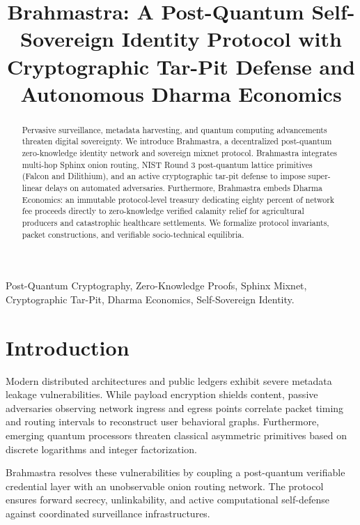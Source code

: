 \documentclass[conference,leqno]{IEEEtran}
\title{Brahmastra: A Post-Quantum Self-Sovereign Identity Protocol with Cryptographic Tar-Pit Defense and Autonomous Dharma Economics}
\author{\IEEEauthorblockN{Atmakuri Naresh}
\IEEEauthorblockA{\textit{Lead Architect \& Benevolent Dictator for Life (BDFL)} \\
\textit{Brahmastra Sovereign Core Foundation}\\
Zug, Switzerland / Puttaparthi, India \\
core@brahmastra.network}
}
\begin{document}
\maketitle

\begin{abstract}
Pervasive surveillance, metadata harvesting, and quantum computing advancements threaten digital sovereignty. We introduce Brahmastra, a decentralized post-quantum zero-knowledge identity network and sovereign mixnet protocol. Brahmastra integrates multi-hop Sphinx onion routing, NIST Round 3 post-quantum lattice primitives (Falcon and Dilithium), and an active cryptographic tar-pit defense to impose super-linear delays on automated adversaries. Furthermore, Brahmastra embeds Dharma Economics: an immutable protocol-level treasury dedicating eighty percent of network fee proceeds directly to zero-knowledge verified calamity relief for agricultural producers and catastrophic healthcare settlements. We formalize protocol invariants, packet constructions, and verifiable socio-technical equilibria.
\end{abstract}

\begin{IEEEkeywords}
Post-Quantum Cryptography, Zero-Knowledge Proofs, Sphinx Mixnet, Cryptographic Tar-Pit, Dharma Economics, Self-Sovereign Identity.
\end{IEEEkeywords}

\section{Introduction}
Modern distributed architectures and public ledgers exhibit severe metadata leakage vulnerabilities. While payload encryption shields content, passive adversaries observing network ingress and egress points correlate packet timing and routing intervals to reconstruct user behavioral graphs. Furthermore, emerging quantum processors threaten classical asymmetric primitives based on discrete logarithms and integer factorization.

Brahmastra resolves these vulnerabilities by coupling a post-quantum verifiable credential layer with an unobservable onion routing network. The protocol ensures forward secrecy, unlinkability, and active computational self-defense against coordinated surveillance infrastructures.
\end{document}
